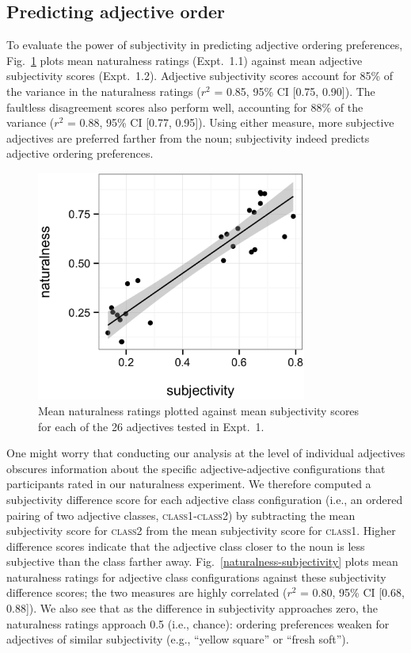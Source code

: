 \documentclass[12pt]{article}
\begin{document}
\subsection{Predicting adjective order}

To evaluate the power of subjectivity in predicting adjective ordering preferences, Fig.~\ref{naturalness-subjectivity-pred} plots mean naturalness ratings (Expt.~1.1) against mean adjective subjectivity scores (Expt.~1.2). Adjective subjectivity scores account for  85\% of the variance in the naturalness ratings ($r^2$ = 0.85, 95\% CI [0.75, 0.90]).
The faultless disagreement scores also perform well, accounting for 88\% of the variance ($r^2$ = 0.88, 95\% CI [0.77, 0.95]).  
Using either measure, more subjective adjectives are preferred farther from the noun; subjectivity indeed predicts adjective ordering preferences.

\begin{figure}
	\centering\includegraphics[width=3.5in]{plots/naturalness-subjectivity-new.eps}
	\caption{Mean naturalness ratings plotted against mean subjectivity scores for each of the 26 adjectives tested in Expt.~1.}\label{naturalness-subjectivity-pred}
\end{figure}

One might worry that conducting our analysis at the level of individual adjectives obscures information about the specific adjective-adjective configurations that participants rated in our naturalness experiment.
We therefore computed a subjectivity difference score for each adjective class configuration (i.e., an ordered pairing of two adjective classes, \textsc{class1}-\textsc{class2}) by subtracting the mean subjectivity score for \textsc{class2} from the mean subjectivity score for \textsc{class1}. Higher difference scores indicate that the adjective class closer to the noun is less subjective than the class farther away. Fig.~\ref{naturalness-subjectivity} plots mean naturalness ratings for adjective class configurations against these subjectivity difference scores; the two measures are highly correlated ($r^2$ = 0.80, 95\% CI [0.68, 0.88]). We also see that as the difference in subjectivity approaches zero, the naturalness ratings approach 0.5 (i.e., chance): ordering preferences weaken for adjectives of similar subjectivity (e.g., ``yellow square'' or ``fresh soft''). %
\end{document}
